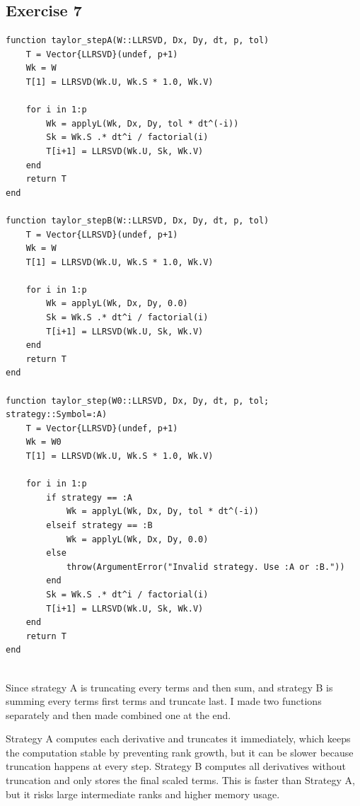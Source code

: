 \documentclass[11pt]{article}
\begin{document}
\subsection*{Exercise 7}
\begin{lstlisting}
function taylor_stepA(W::LLRSVD, Dx, Dy, dt, p, tol)
    T = Vector{LLRSVD}(undef, p+1)
    Wk = W
    T[1] = LLRSVD(Wk.U, Wk.S * 1.0, Wk.V)

    for i in 1:p
        Wk = applyL(Wk, Dx, Dy, tol * dt^(-i))
        Sk = Wk.S .* dt^i / factorial(i)
        T[i+1] = LLRSVD(Wk.U, Sk, Wk.V)
    end
    return T
end

function taylor_stepB(W::LLRSVD, Dx, Dy, dt, p, tol)
    T = Vector{LLRSVD}(undef, p+1)
    Wk = W
    T[1] = LLRSVD(Wk.U, Wk.S * 1.0, Wk.V)

    for i in 1:p
        Wk = applyL(Wk, Dx, Dy, 0.0)
        Sk = Wk.S .* dt^i / factorial(i)
        T[i+1] = LLRSVD(Wk.U, Sk, Wk.V)
    end
    return T
end

function taylor_step(W0::LLRSVD, Dx, Dy, dt, p, tol; strategy::Symbol=:A)
    T = Vector{LLRSVD}(undef, p+1)
    Wk = W0
    T[1] = LLRSVD(Wk.U, Wk.S * 1.0, Wk.V)

    for i in 1:p
        if strategy == :A
            Wk = applyL(Wk, Dx, Dy, tol * dt^(-i))
        elseif strategy == :B
            Wk = applyL(Wk, Dx, Dy, 0.0)
        else
            throw(ArgumentError("Invalid strategy. Use :A or :B."))
        end
        Sk = Wk.S .* dt^i / factorial(i)
        T[i+1] = LLRSVD(Wk.U, Sk, Wk.V)
    end
    return T
end


\end{lstlisting}

Since strategy A is truncating every terms and then sum, and strategy B is summing every terms first terms and truncate last. I made two functions separately and then made combined one at the end. 

\vspace{0.8em}

Strategy A computes each derivative and truncates it immediately, which keeps the computation stable by preventing rank growth, but it can be slower because truncation happens at every step.
Strategy B computes all derivatives without truncation and only stores the final scaled terms. This is faster than Strategy A, but it risks large intermediate ranks and higher memory usage.
\end{document}
